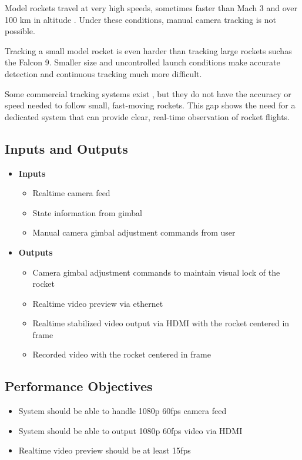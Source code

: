 \documentclass{article}
\begin{document}
Model rockets travel at very high speeds, sometimes faster than Mach 3 and over
100 km in altitude \citep{SpaceConcordiaRocketry2025}. Under these conditions,
manual camera tracking is not possible.

Tracking a small model rocket is even harder than tracking large rockets suchas
the Falcon 9. Smaller size and uncontrolled launch conditions make accurate
detection and continuous tracking much more difficult.

Some commercial tracking systems exist \citep{AverTR3XX2021}, but they do not
have the accuracy or speed needed to follow small, fast-moving rockets. This
gap shows the need for a dedicated system that can provide clear, real-time
observation of rocket flights.

\subsection{Inputs and Outputs}
\begin{itemize}
  \item \textbf{Inputs}
        \begin{itemize}
          \item Realtime camera feed
          \item State information from gimbal
          \item Manual camera gimbal adjustment commands from user
        \end{itemize}

  \item \textbf{Outputs}
        \begin{itemize}
          \item Camera gimbal adjustment commands to maintain visual lock of the rocket
          \item Realtime video preview via ethernet
          \item Realtime stabilized video output via HDMI with the rocket centered in frame
          \item Recorded video with the rocket centered in frame
        \end{itemize}
\end{itemize}

\subsection{Performance Objectives}
\label{sec:performance}

\begin{itemize}
  \item System should be able to handle 1080p 60fps camera feed
  \item System should be able to output 1080p 60fps video via HDMI
  \item Realtime video preview should be at least 15fps
\end{itemize}
\end{document}
